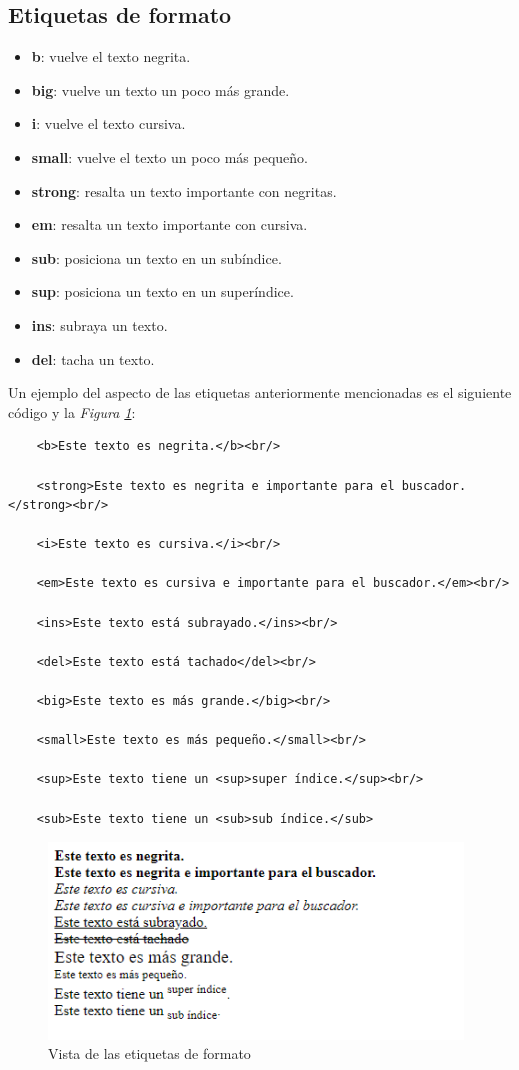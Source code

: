 \subsection{Etiquetas de formato}
\begin{itemize}
    \item \textbf{b}: vuelve el texto negrita.
    \item \textbf{big}: vuelve un texto un poco más grande.
    \item \textbf{i}: vuelve el texto cursiva.
    \item \textbf{small}: vuelve el texto un poco más pequeño.
    \item \textbf{strong}: resalta un texto importante con negritas.
    \item \textbf{em}: resalta un texto importante con cursiva.
    \item \textbf{sub}: posiciona un texto en un subíndice.
    \item \textbf{sup}: posiciona un texto en un superíndice.
    \item \textbf{ins}: subraya un texto.
    \item \textbf{del}: tacha un texto.
\end{itemize}

Un ejemplo del aspecto de las etiquetas anteriormente mencionadas es el siguiente código y la \textit{Figura \ref{fig: 2}}:
\begin{lstlisting}
    <b>Este texto es negrita.</b><br/>
    
    <strong>Este texto es negrita e importante para el buscador.</strong><br/>
    
    <i>Este texto es cursiva.</i><br/>
    
    <em>Este texto es cursiva e importante para el buscador.</em><br/>
    
    <ins>Este texto está subrayado.</ins><br/>
    
    <del>Este texto está tachado</del><br/>
    
    <big>Este texto es más grande.</big><br/>
    
    <small>Este texto es más pequeño.</small><br/>
    
    <sup>Este texto tiene un <sup>super índice.</sup><br/>
    
    <sub>Este texto tiene un <sub>sub índice.</sub>
\end{lstlisting}
\begin{figure}[H]
    \centering
    \caption{Vista de las etiquetas de formato}
    \label{fig: 2}
    \includegraphics[width=11cm]{ss_html/etiquetas_formato.png}
\end{figure}


